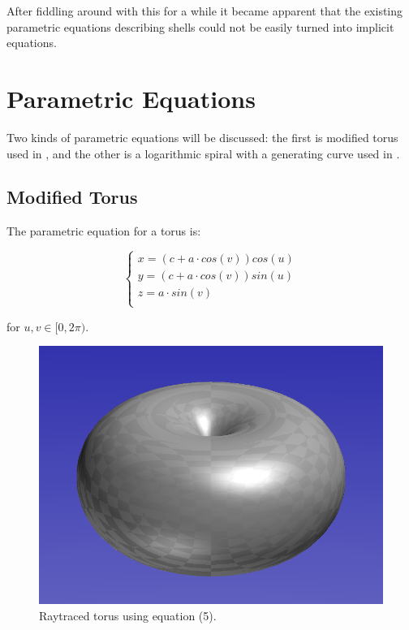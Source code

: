 \documentclass[a4paper]{article}
\begin{document}
After fiddling around with this for a while it became apparent that the existing parametric equations describing shells could not be easily turned into implicit equations.

\section{Parametric Equations}

Two kinds of parametric equations will be discussed: the first is modified torus used in \cite{povray-seashells}, and the other is a logarithmic spiral with a generating curve used in \cite{JORGEPICADO}.

\subsection{Modified Torus}

The parametric equation for a torus is:

\begin{equation}
	\begin{cases}
		x = (c + a \cdot cos(v)) cos(u)\\
		y = (c + a \cdot cos(v)) sin(u)\\
		z = a \cdot sin(v)\\
	\end{cases}
\end{equation}

for $u,v \in  [0, 2\pi)$.

\begin{figure}[h]
	\centering\includegraphics[scale=0.3]{./img/torus.png}
	\caption{Raytraced torus using equation (5).}
	\label{torus} %
\end{figure}
\end{document}
